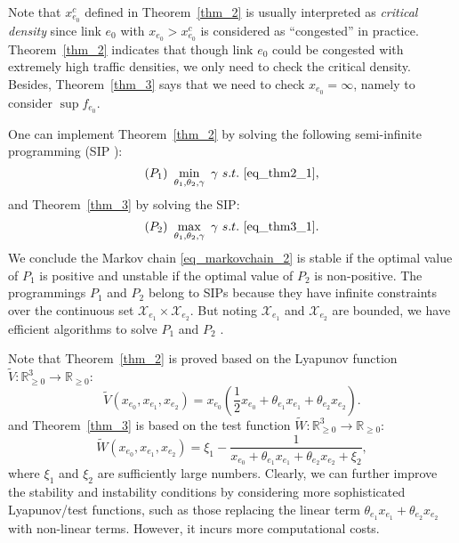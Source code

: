 Note that $x_{e_0}^c$ defined in Theorem~\ref{thm_2} is usually interpreted as \emph{critical density} since link $e_0$ with $x_{e_0}>x_{e_0}^c$ is considered as ``congested'' in practice. Theorem~\ref{thm_2} indicates that though link $e_0$ could be congested with extremely high traffic densities, we only need to check the critical density. Besides, Theorem~\ref{thm_3} says that we need to check $x_{e_0}=\infty$, namely to consider $\sup f_{e_0}$. 

One can implement Theorem~\ref{thm_2} by solving the following semi-infinite programming (SIP \cite{stein2012solve}):
\begin{equation}
    (P_1)~ \min_{\theta_1,\theta_2,\gamma}~\gamma~s.t.~\eqref{eq_thm2_1},
\end{equation}
and Theorem~\ref{thm_3} by solving the SIP: 
\begin{equation}
    (P_2)~ \max_{\theta_1,\theta_2,\gamma}~\gamma~s.t.~\eqref{eq_thm3_1}.
\end{equation}
We conclude the Markov chain \eqref{eq_markovchain_2} is stable if the optimal value of $P_1$ is positive and unstable if the optimal value of $P_2$ is non-positive. The programmings $P_1$ and $P_2$ belong to SIPs because they have infinite constraints over the continuous set $\mathcal{X}_{e_1}\times\mathcal{X}_{e_2}$. But noting $\mathcal{X}_{e_1}$ and $\mathcal{X}_{e_2}$ are bounded, we have efficient algorithms to solve $P_1$ and $P_2$ \cite{stein2012solve}.

Note that Theorem~\ref{thm_2} is proved based on the Lyapunov function $\tilde V:\mathbb{R}_{\geq0}^3\to\mathbb{R}_{\geq0}$:
\begin{equation}
    \tilde{V}(x_{e_0}, x_{e_1},x_{e_2}) = x_{e_0}(\frac{1}{2}x_{e_0} + \theta_{e_1}x_{e_1} + \theta_{e_2}x_{e_2}). \label{eq_lyaunov_2}
\end{equation}
and Theorem~\ref{thm_3} is based on the test function $\tilde{W}:\mathbb{R}_{\geq0}^3\to\mathbb{R}_{\geq0}$:
\begin{equation}
    \tilde{W}(x_{e_0},x_{e_1},x_{e_2}) = \xi_1 - \frac{1}{x_{e_0}+ \theta_{e_1}x_{e_1} + \theta_{e_2}x_{e_2} + \xi_2}, \label{eq_lyapunov_3}
\end{equation}
where $\xi_1$ and $\xi_2$ are sufficiently large numbers. Clearly, we can further improve the stability and instability conditions by considering more sophisticated Lyapunov/test functions, such as those replacing the linear term $\theta_{e_1}x_{e_1}+\theta_{e_2}x_{e_2}$ with non-linear terms. However, it incurs more computational costs. 

